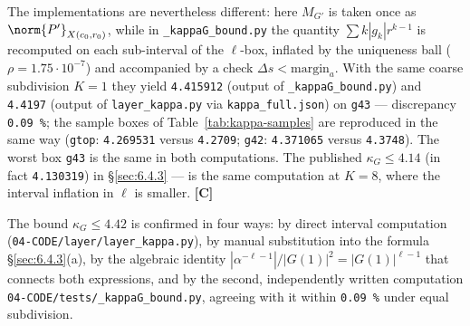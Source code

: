 The implementations are nevertheless different: here $M_{G'}$ is taken once as
$\norm{P'}_{X(c_{0},r_{0})}$, while in \texttt{\_\allowbreak kappaG\_\allowbreak bound.py} the quantity $\sum k|g_{k}| r^{k-1}$
is recomputed on each sub-interval of the $\ell$-box, inflated by the uniqueness ball
($\rho = 1.75\cdot 10^{-7}$) and accompanied by a check $\Delta s < \mathrm{margin}_a$. With the same coarse subdivision
$K = 1$ they yield \texttt{4.415912} (output of \texttt{\_\allowbreak kappaG\_\allowbreak bound.py}) and \texttt{4.4197} (output of
\texttt{layer\_\allowbreak kappa.py} via \texttt{kappa\_\allowbreak full.json}) on \texttt{g43} --- discrepancy \texttt{0.09 \%}; the sample boxes of
Table~\ref{tab:kappa-samples} are reproduced in the same way (\texttt{gtop}: \texttt{4.269531} versus \texttt{4.2709};
\texttt{g42}: \texttt{4.371065} versus \texttt{4.3748}). The worst box \texttt{g43} is the same in both computations.
The published $\kappa_G \le 4.14$ (in fact \texttt{4.130319}) in \S\ref{sec:6.4.3} --- is the same computation at
$K = 8$, where the interval inflation in $\ell$ is smaller. \textbf{[C]}

The bound $\kappa_G \le 4.42$ is confirmed in four ways: by direct interval computation
(\texttt{04-\allowbreak CODE/\allowbreak layer/\allowbreak layer\_\allowbreak kappa.py}), by manual substitution into the formula
\S\ref{sec:6.4.3}(a), by the algebraic identity $|\alpha^{-\ell-1}|/|G(1)|^{2} = |G(1)|^{\ell-1}$ that
connects both expressions, and by the second, independently written computation
\texttt{04-\allowbreak CODE/\allowbreak tests/\allowbreak \_\allowbreak kappaG\_\allowbreak bound.py}, agreeing with it within \texttt{0.09 \%} under equal
subdivision.

